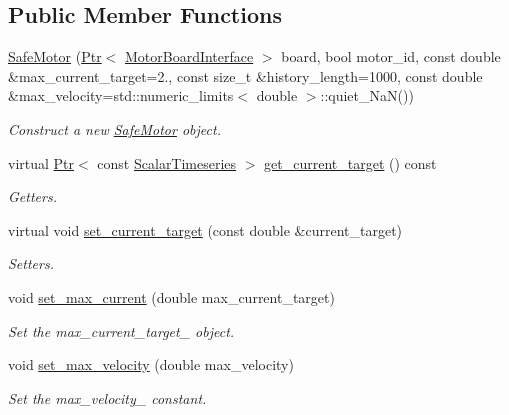 \subsection*{Public Member Functions}
\begin{DoxyCompactItemize}
\item 
\hyperlink{classblmc__drivers_1_1SafeMotor_a6e9cda054c161d28f062955d97e73f82}{Safe\+Motor} (\hyperlink{classblmc__drivers_1_1MotorInterface_ae31f230b9da3674a05543023c90b124c}{Ptr}$<$ \hyperlink{classblmc__drivers_1_1MotorBoardInterface}{Motor\+Board\+Interface} $>$ board, bool motor\+\_\+id, const double \&max\+\_\+current\+\_\+target=2., const size\+\_\+t \&history\+\_\+length=1000, const double \&max\+\_\+velocity=std\+::numeric\+\_\+limits$<$ double $>$\+::quiet\+\_\+\+NaN())
\begin{DoxyCompactList}\small\item\em Construct a new \hyperlink{classblmc__drivers_1_1SafeMotor}{Safe\+Motor} object. \end{DoxyCompactList}\item 
virtual \hyperlink{classblmc__drivers_1_1MotorInterface_ae31f230b9da3674a05543023c90b124c}{Ptr}$<$ const \hyperlink{classblmc__drivers_1_1MotorInterface_a49b8fc916b9f9debbd7b0988463db5cd}{Scalar\+Timeseries} $>$ \hyperlink{classblmc__drivers_1_1SafeMotor_a2c938b6289e41a7d3ab8a19a045382e0}{get\+\_\+current\+\_\+target} () const 
\begin{DoxyCompactList}\small\item\em Getters. \end{DoxyCompactList}\item 
virtual void \hyperlink{classblmc__drivers_1_1SafeMotor_adedaee24408b94b3d1ed8f856e218b12}{set\+\_\+current\+\_\+target} (const double \&current\+\_\+target)
\begin{DoxyCompactList}\small\item\em Setters. \end{DoxyCompactList}\item 
void \hyperlink{classblmc__drivers_1_1SafeMotor_ad4f4bb531e2a9e7f965b319afb53d43c}{set\+\_\+max\+\_\+current} (double max\+\_\+current\+\_\+target)
\begin{DoxyCompactList}\small\item\em Set the max\+\_\+current\+\_\+target\+\_\+ object. \end{DoxyCompactList}\item 
void \hyperlink{classblmc__drivers_1_1SafeMotor_aaa0083a39d815d7b3cd38c680bfea48a}{set\+\_\+max\+\_\+velocity} (double max\+\_\+velocity)
\begin{DoxyCompactList}\small\item\em Set the max\+\_\+velocity\+\_\+ constant. \end{DoxyCompactList}\end{DoxyCompactItemize}
